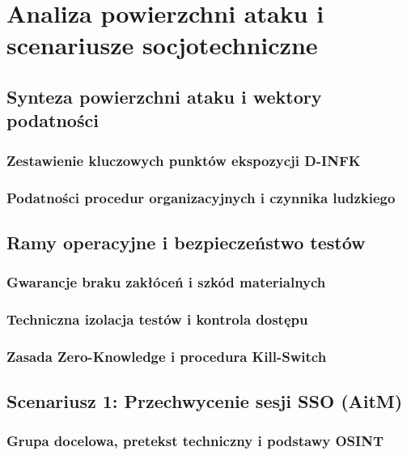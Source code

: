 \chapter{Analiza powierzchni ataku i scenariusze socjotechniczne}\label{ch:socjotechnika}

\section{Synteza powierzchni ataku i wektory podatności}\label{sec:synteza-powierzchni-ataku}

\subsection{Zestawienie kluczowych punktów ekspozycji D-INFK}\label{subsec:punkty-ekspozycji}
\subsection{Podatności procedur organizacyjnych i czynnika ludzkiego}\label{subsec:podatnosci-ludzkie}

\section{Ramy operacyjne i bezpieczeństwo testów}\label{sec:ramy-bezpieczenstwa}
\subsection{Gwarancje braku zakłóceń i szkód materialnych}\label{subsec:brak-szkod}
\subsection{Techniczna izolacja testów i kontrola dostępu}\label{subsec:mechanizmy-ochronne}
\subsection{Zasada Zero-Knowledge i procedura Kill-Switch}\label{subsec:kill-switch}

\section{Scenariusz 1: Przechwycenie sesji SSO (AitM)}\label{sec:scenariusz-1}
\subsection{Grupa docelowa, pretekst techniczny i podstawy OSINT}\label{subsec:scen1-cel}

